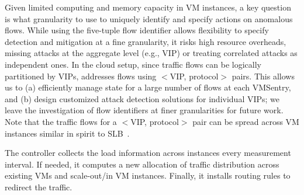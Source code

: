 Given limited computing and memory capacity in VM instances, a key question is what granularity to use to uniquely identify 
and specify actions on anomalous flows. %
While using the five-tuple flow identifier allows flexibility to specify detection and mitigation at a fine granularity,  
it risks high resource overheads, 
missing attacks at the aggregate level (e.g., VIP) or treating correlated attacks as independent ones. 
In the cloud setup, since traffic flows can be logically partitioned by VIPs, \nimbus addresses flows using $<$VIP, protocol$>$ pairs. This allows us to 
(a) efficiently manage state for a large number of flows at each VMSentry,
and (b) design customized attack detection solutions for individual VIPs;
we leave the investigation of flow identifiers at finer granularities for future work.
Note that the traffic flows for a $<$VIP, protocol$>$ pair can
be spread across VM instances 
similar in spirit to SLB~\cite{Patel13}. 
	



The controller collects the load information across instances every 
measurement interval. 
If needed, it computes a new allocation of traffic distribution across existing VMs and
scale-out/in VM instances. Finally, it installs routing rules to redirect the traffic. 


